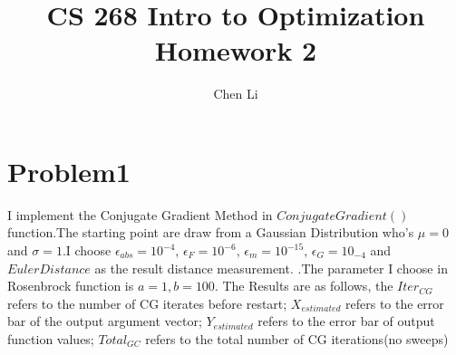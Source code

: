 \documentclass[11pt]{article}
\title{CS 268 Intro to Optimization Homework 2}
\author{Chen Li}
\begin{document}
\maketitle
\section{Problem1} 
I implement the Conjugate Gradient Method in $ConjugateGradient()$ function.The starting point are draw from a Gaussian Distribution who's $\mu=0$ and $\sigma=1$.I choose $\epsilon_{abs}=10^{-4}$, $\epsilon_{F}=10^{-6}$, $\epsilon_{m}=10^{-15}$, $\epsilon_{G} = 10_{-4}$ and $Euler Distance$ as the result distance measurement. .The parameter I choose in Rosenbrock function is $a=1,b=100$. The Results are as follows, the $Iter_{CG}$ refers to the number of CG iterates before restart; $X_{estimated}$ refers to the error bar of the output argument vector; $Y_{estimated}$ refers to the error bar of output function values; $Total_{GC}$ refers to the total number of CG iterations(no sweeps) 
\end{document}
